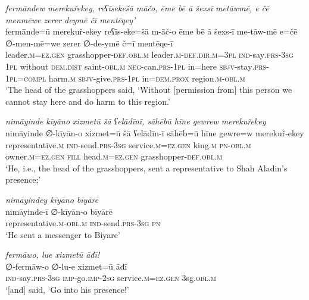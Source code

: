 \ea \label{PM.5}
\textit{fermāndew merekuřekey, reʕīsekešā māčo, ēme bē ā šexsī metāwmē, e čē menmēwe zerer deymē čī mentēqey’} \\ 
\gll fermānde=ū merekuř-ekey reʕīs-eke=šā m-āč-o ēme bē ā šexs-ī me-tāw-mē e=čē ∅-men-mē=we zerer ∅-de-ymē č=ī mentēqe-ī \\ 
 leader\textsc{.m}\textsc{\textsc{=ez.gen}} grasshopper\textsc{-def}\textsc{.obl}\textsc{.m} leader\textsc{.m}\textsc{-def}\textsc{.dir}\textsc{.m}\textsc{=3pl} \textsc{ind-}say\textsc{.prs}\textsc{-3sg} \textsc{1pl} without \textsc{dem.dist} saint\textsc{-obl}\textsc{.m} \textsc{neg-}can\textsc{.prs}\textsc{-1pl} in=here \textsc{sbjv-}stay\textsc{.prs}\textsc{-1pl}\textsc{=compl} harm\textsc{.m} \textsc{sbjv-}give\textsc{.prs}-\textsc{1pl} in=\textsc{dem.prox} region\textsc{.m}\textsc{-obl}\textsc{.m} \\ 
\glt `The head of the grasshoppers said, ‘Without [permission from] this person we cannot stay here and do harm to this region.'
\z 
 
\ea \label{PM.6}
\textit{nimāyinde kīyāno xizmetū šā ʕelādīnī, sāhēbū hīne gewrew merekuřekey} \\ 
\gll nimāyinde ∅-kīyān-o xizmet=ū šā ʕelādīn-ī sāhēb=ū hīne gewre=w merekuř-ekey \\ 
 representative\textsc{.m} \textsc{ind-}send\textsc{.prs}\textsc{-3sg} service\textsc{.m}\textsc{\textsc{=ez.gen}} king\textsc{.m} \textsc{pn}\textsc{-obl}\textsc{.m} owner\textsc{.m}\textsc{\textsc{=ez.gen}} \textsc{fill} head\textsc{.m}\textsc{\textsc{=ez.gen}} grasshopper\textsc{-def}\textsc{.obl}\textsc{.m} \\ 
\glt `He, i.e., the head of the grasshoppers, sent a representative to Shah Aladin’s presence;'
\z 
 
\ea \label{PM.7}
\textit{nimāyindey kīyāno bīyārē} \\ 
\gll nimāyinde-ī ∅-kīyān-o bīyārē \\ 
 representative\textsc{.m}\textsc{-obl}\textsc{.m} \textsc{ind-}send\textsc{.prs}\textsc{-3sg} \textsc{pn} \\ 
\glt `He sent a messenger to Biyare'
\z 
 
\ea \label{PM.8}
\textit{fermāwo, lue xizmetū āđī!} \\ 
\gll ∅-fermāw-o ∅-lu-e xizmet=ū āđī \\ 
 \textsc{ind-}say\textsc{.prs}\textsc{-3sg} \textsc{imp-}go.\textsc{imp-}\textsc{2sg} service\textsc{.m}\textsc{\textsc{=ez.gen}} 3sg\textsc{.obl}\textsc{.m} \\ 
\glt `[and] said, ‘Go into his presence!'
\z 
 
